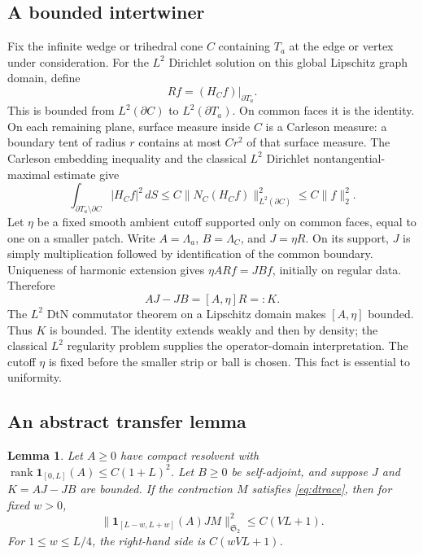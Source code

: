 \documentclass[11pt]{amsart}
\numberwithin{equation}{section}
\newtheorem{lemma}[theorem]{Lemma}
\theoremstyle{remark}
\newcommand{\rank}{\operatorname{rank}}
\newcommand{\one}{\mathbf{1}}
\newcommand{\Stwo}{\mathfrak{S}_2}
\begin{document}
\subsection{A bounded intertwiner}
Fix the infinite wedge or trihedral cone $C$ containing $T_a$ at the edge or vertex under consideration. For the $L^2$ Dirichlet solution on this global Lipschitz graph domain, define
\begin{equation}\label{eq:intertwiner}
Rf=(H_Cf)|_{\partial T_a} .
\end{equation}
This is bounded from $L^2(\partial C)$ to $L^2(\partial T_a)$. On common faces it is the identity. On each remaining plane, surface measure inside $C$ is a Carleson measure: a boundary tent of radius $r$ contains at most $Cr^2$ of that surface measure. The Carleson embedding inequality and the classical $L^2$ Dirichlet nontangential-maximal estimate give
\begin{equation}\label{eq:carleson}
\int_{\partial T_a\setminus\partial C}|H_Cf|^2\,dS\le C\|N_C(H_Cf)\|_{L^2(\partial C)}^2\le C\|f\|_2^2 .
\end{equation}
Let $\eta$ be a fixed smooth ambient cutoff supported only on common faces, equal to one on a smaller patch. Write $A=\Lambda_a$, $B=\Lambda_C$, and $J=\eta R$. On its support, $J$ is simply multiplication followed by identification of the common boundary. Uniqueness of harmonic extension gives $\eta ARf=JBf$, initially on regular data. Therefore
\begin{equation}\label{eq:intertwining}
AJ-JB=[A,\eta]R=:K .
\end{equation}
The $L^2$ DtN commutator theorem on a Lipschitz domain \cite[Theorem~1.1]{S} makes $[A,\eta]$ bounded. Thus $K$ is bounded. The identity extends weakly and then by density; the classical $L^2$ regularity problem supplies the operator-domain interpretation. The cutoff $\eta$ is fixed before the smaller strip or ball is chosen. This fact is essential to uniformity.

\subsection{An abstract transfer lemma}
\begin{lemma}\label{lem:transfer}
Let $A\ge0$ have compact resolvent with $\rank\one_{[0,L]}(A)\le C(1+L)^2$. Let $B\ge0$ be self-adjoint, and suppose $J$ and $K=AJ-JB$ are bounded. If the contraction $M$ satisfies \eqref{eq:dtrace}, then for fixed $w>0$,
\begin{equation}\label{eq:transfer}
\|\one_{[L-w,L+w]}(A)JM\|_{\Stwo}^2\le C(VL+1) .
\end{equation}
For $1\le w\le L/4$, the right-hand side is $C(wVL+1)$.
\end{lemma}
\end{document}
